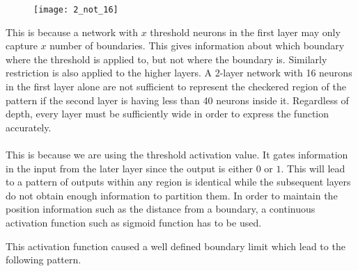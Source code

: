  \begin{figure}[H]
	\centering
	\texttt{[image: 2\_not\_16]}
\end{figure}

\hfill\break
This is because a network with $x$ threshold neurons in the first layer may only capture $x$ number of boundaries. This gives information about which boundary where the threshold is applied to, but not where the boundary is. Similarly restriction is also applied to the higher layers. A 2-layer network with 16 neurons in the first layer alone are not sufficient to represent the checkered region of the pattern if the second layer is having less than 40 neurons inside it. Regardless of depth, every layer must be sufficiently wide in order to express the function accurately.
\\\\
This is because we are using the threshold activation value. It gates information in the input from the later layer since the output is either $0$ or $1$. This will lead to a pattern of outputs within any region is identical while the subsequent layers do not obtain enough information to partition them. In order to maintain the position information such as the distance from a boundary, a continuous activation function such as sigmoid function has to be used.

\begin{figure}[H]
	\centering
\end{figure}

\hfill\break
This activation function caused a well defined boundary limit which lead to the following pattern.

